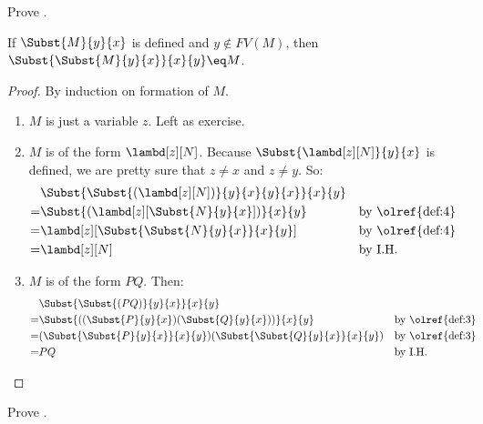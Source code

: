 \documentclass[../../../include/open-logic-section]{subfiles}
\begin{document}
\begin{prob}
  Prove .
\end{prob}


\begin{thm}
  If $\Subst{M}{y}{x}$ is defined and $y \notin FV(M)$, then $\Subst{\Subst{M}{y}{x}}{x}{y} \eq M$.
\end{thm}
\begin{proof}
  By induction on formation of $M$.
  \begin{enumerate}
  \item $M$ is just a variable $z$. Left as exercise. 
  \item $M$ is of the form $\lambd[z][N]$. Because
    $\Subst{\lambd[z][N]}{y}{x}$ is defined, we are pretty sure
    that $z \neq x$ and $z \neq y$. So:
    \begin{align*}
      &\Subst{\Subst{(\lambd[z][N])}{y}{x}{y}{x}}{x}{y}\\
      =&\Subst{(\lambd[z][\Subst{N}{y}{x}])}{x}{y}
       && \text{by \olref{def:4}} \\
      =&\lambd[z][\Subst{\Subst{N}{y}{x}}{x}{y}]
       && \text{by \olref{def:4}} \\
      =&\lambd[z][N] && \text{by I.H.} 
    \end{align*}
  \item $M$ is of the form $PQ$. Then:
    \begin{align*}
      &\Subst{\Subst{(PQ)}{y}{x}}{x}{y} \\
      =&\Subst{((\Subst{P}{y}{x})(\Subst{Q}{y}{x}))}{x}{y}
         && \text{by \olref{def:3}} \\
      =&(\Subst{\Subst{P}{y}{x}}{x}{y})(\Subst{\Subst{Q}{y}{x}}{x}{y})
         && \text{by \olref{def:3}} \\
      =&PQ &&\text{by I.H.}
    \end{align*}
  \end{enumerate}
\end{proof}
\begin{prob}
  Prove .
\end{prob}
\end{document}
